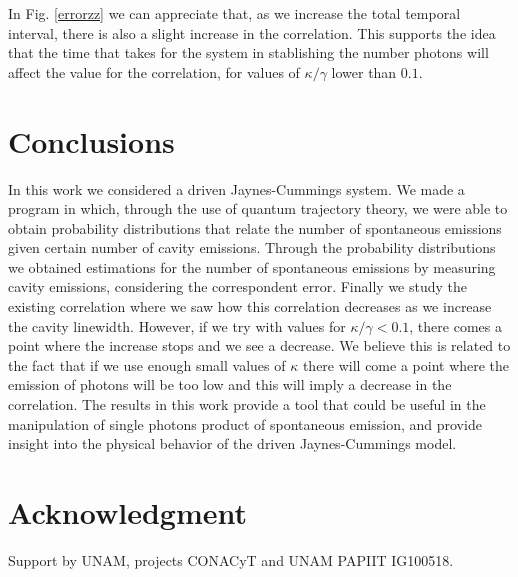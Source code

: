 \documentclass[conference]{IEEEtran}
\begin{document}
In Fig. \ref{errorzz} we can appreciate that, as we increase the total temporal interval, there is also a slight increase in the correlation. This supports the idea that the time that takes for the system in stablishing the number photons will affect the value for the correlation, for values of $\kappa/\gamma$ lower than $0.1$.

\section{Conclusions}\label{sc:conclusions}
In this work we considered a driven Jaynes-Cummings system. We made a program in which, through the use of quantum trajectory theory, we were able to obtain probability distributions that relate the number of spontaneous emissions given certain number of cavity emissions. Through the probability distributions we obtained estimations for the number of spontaneous emissions by measuring cavity emissions, considering the correspondent error. Finally we study the existing correlation where we saw how this correlation decreases as we increase the cavity linewidth. However, if we try with values for  $\kappa/\gamma < 0.1$, there comes a point where the increase stops and we see a decrease. We believe this is related to the fact that if we use enough small values of $\kappa$ there will come a point where the emission of photons will be too low and this will imply a decrease in the correlation. The results in this work provide a tool that could be useful in the manipulation of single photons product of spontaneous emission, and provide insight into the physical behavior of the driven Jaynes-Cummings model.


\section*{Acknowledgment}

Support by UNAM, projects CONACyT and UNAM PAPIIT IG100518.




\end{document}
